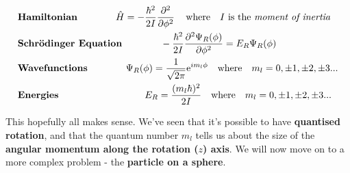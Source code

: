 \documentclass{memoir}[11pt,oneside,a4paper,openany]
\newenvironment{myblock}[1]{%
    \tcolorbox[beamer,%
    noparskip,breakable,
    colback=LightBlue,colframe=DarkBlue,%
    colbacklower=DarkBlue!75!LightBlue,%
    title=#1]}%
    {\endtcolorbox}
\newcommand{\wf}{\ensuremath{\Psi}\xspace}
\begin{document}
\begin{myblock}{\begin{center}Particle on a Ring\end{center}}
	\begin{center}
		\begin{align*} & \text{\textbf{Hamiltonian}} \qquad\qquad \hat{H} = -\frac{\hbar^2}{2I}\frac{\partial^2}{\partial \phi^2} \,\quad  \text{where} \quad I \,\,\text{is the \emph{moment of inertia}} \\
			& \text{\textbf{Schr{\"o}dinger Equation}} \qquad\qquad -\frac{\hbar^2}{2I}\frac{\partial^2\wf_R(\phi)}{\partial \phi^2} = E_R \wf_R(\phi) \\
			& \text{\textbf{Wavefunctions}} \qquad\qquad \wf_R(\phi) = \frac{1}{\sqrt{2\pi}}\mathrm{e}^{im_l\phi} \quad \text{where} \quad m_l=0,\pm1,\pm2,\pm3...\\
			& \text{\textbf{Energies}} \qquad\qquad\qquad\qquad\quad E_R = \frac{(m_l\hbar)^2}{2I} \quad \text{where} \quad m_l=0,\pm1,\pm2,\pm3...
	\end{align*}
	\end{center}
\end{myblock}

This hopefully all makes sense. We've seen that it's possible to have \textbf{quantised rotation}, and that the quantum number $m_l$ tells us about the size of the \textbf{angular momentum along the rotation ($z$) axis}. We will now move on to a more complex problem - the \textbf{particle on a sphere}.
\newpage
\end{document}
